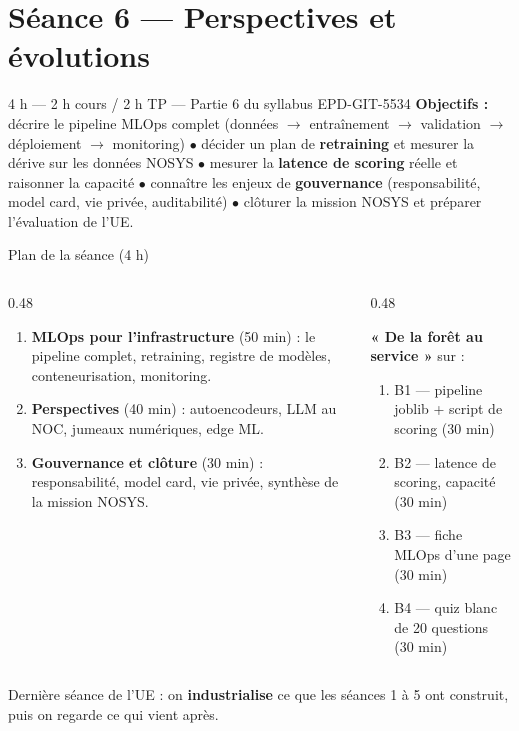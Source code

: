 \section{Séance 6 --- Perspectives et évolutions}
{4 h --- 2 h cours / 2 h TP --- Partie 6 du syllabus EPD-GIT-5534}
{\textbf{Objectifs :} décrire le pipeline MLOps complet (données $\rightarrow$
entraînement $\rightarrow$ validation $\rightarrow$ déploiement $\rightarrow$
monitoring) $\bullet$ décider un plan de \textbf{retraining} et mesurer la
dérive sur les données NOSYS $\bullet$ mesurer la \textbf{latence de scoring}
réelle et raisonner la capacité $\bullet$ connaître les enjeux de
\textbf{gouvernance} (responsabilité, model card, vie privée, auditabilité)
$\bullet$ clôturer la mission NOSYS et préparer l'évaluation de l'UE.}

\begin{frame}{Plan de la séance (4 h)}
\begin{columns}[t]
\begin{column}{0.48\textwidth}
\begin{kbox}
\begin{enumerate}
\item \textbf{MLOps pour l'infrastructure} (50 min) : le pipeline complet,
retraining, registre de modèles, conteneurisation, monitoring.
\item \textbf{Perspectives} (40 min) : autoencodeurs, LLM au NOC, jumeaux
numériques, edge ML.
\item \textbf{Gouvernance et clôture} (30 min) : responsabilité, model card,
vie privée, synthèse de la mission NOSYS.
\end{enumerate}
\end{kbox}
\end{column}
\begin{column}{0.48\textwidth}
\begin{ebox}
\small\textbf{« De la forêt au service »} sur  :
\begin{enumerate}
\item B1 --- pipeline joblib + script de scoring (30 min)
\item B2 --- latence de scoring, capacité (30 min)
\item B3 --- fiche MLOps d'une page (30 min)
\item B4 --- quiz blanc de 20 questions (30 min)
\end{enumerate}
\end{ebox}
\end{column}
\end{columns}
\vspace{1mm}
\begin{center}\small
Dernière séance de l'UE : on \textbf{industrialise} ce que les séances 1 à 5
ont construit, puis on regarde ce qui vient après.
\end{center}
\end{frame}

